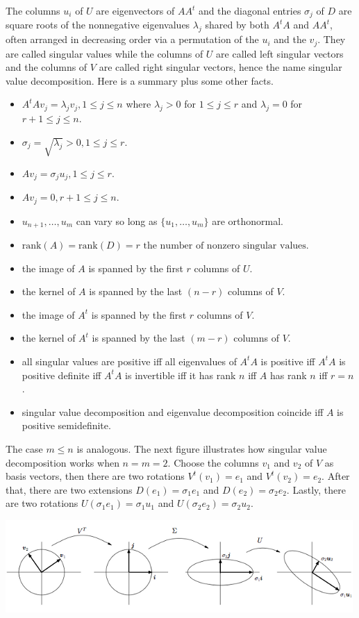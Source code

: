 \documentclass[12pt]{amsart}
\theoremstyle{definition}
\begin{document}
The columns $u_i$ of $U$ are eigenvectors of $AA^t$ and the diagonal entries $\sigma_j$ of $D$ are square roots of the nonnegative eigenvalues $\lambda_j$ shared by both $A^tA$ and $AA^t$, often arranged in decreasing order via a permutation of the $u_i$ and the $v_j$. They are called singular values while the columns of $U$ are called left singular vectors and the columns of $V$ are called right singular vectors, hence the name singular value decomposition. Here is a summary plus some other facts.
\begin{itemize}
\item $A^tAv_j = \lambda_j v_j, 1 \leq j \leq n$ where $\lambda_j > 0$ for $1 \leq j \leq r$ and $\lambda_j = 0$ for $r+1 \leq j \leq n$.
\item $\sigma_j = \sqrt{\lambda_j} > 0, 1 \leq j \leq r$.
\item $Av_j = \sigma_j u_j, 1 \leq j \leq r$.
\item $Av_j = 0, r+1 \leq j \leq n$.
\item $u_{n+1}, \dots , u_m$ can vary so long as $\{u_1, \dots , u_m\}$ are orthonormal.
\item $\text{rank}(A) = \text{rank}(D) = r \text{ the number of nonzero singular values}$.
\item the image of $A$ is spanned by the first $r$ columns of $U$.
\item the kernel of $A$ is spanned by the last $(n-r)$ columns of $V$.
\item the image of $A^t$ is spanned by the first $r$ columns of $V$.
\item the kernel of $A^t$ is spanned by the last $(m-r)$ columns of $V$.
\item all singular values are positive iff all eigenvalues of $A^tA$ is positive iff $A^tA$ is positive definite iff $A^tA$ is invertible iff it has rank $n$ iff $A$ has rank $n$ iff $r = n$.
\item singular value decomposition and eigenvalue decomposition coincide iff $A$ is positive semidefinite.
\end{itemize}

The case $m \leq n$ is analogous. The next figure illustrates how singular value decomposition works when $n = m = 2$. Choose the columns $v_1$ and $v_2$ of $V$ as basis vectors, then there are two rotations $V^t(v_1) = e_1$ and $V^t(v_2) = e_2$. After that, there are two extensions $D(e_1) = \sigma_1 e_1$ and $D(e_2) = \sigma_2 e_2$. Lastly, there are two rotations $U(\sigma_1 e_1) = \sigma_1 u_1$ and $U(\sigma_2 e_2) = \sigma_2 u_2$.
\begin{center}\includegraphics{linear_algebra_svd_illustration.png}
\end{center}
\end{document}
